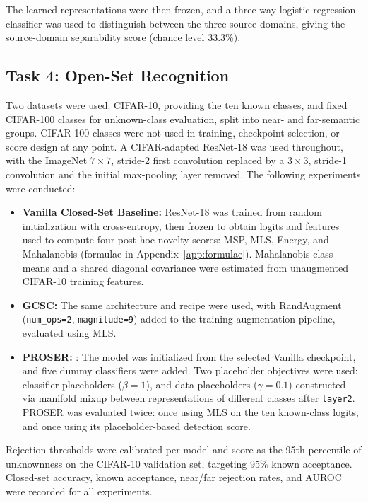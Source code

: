 \documentclass{article}
\begin{document}
The learned representations were then frozen, and a three-way logistic-regression classifier was used to distinguish between the three source domains, giving the source-domain separability score (chance level 33.3\%).
 
\subsection{Task 4: Open-Set Recognition}
\label{subsec:methods-task4}
 
Two datasets were used: CIFAR-10, providing the ten known classes, and fixed CIFAR-100 classes for unknown-class evaluation, split into near- and far-semantic groups. CIFAR-100 classes were not used in training, checkpoint selection, or score design at any point. A CIFAR-adapted ResNet-18 was used throughout, with the ImageNet $7 \times 7$, stride-2 first convolution replaced by a $3 \times 3$, stride-1 convolution and the initial max-pooling layer removed. The following experiments were conducted:
 
\begin{itemize}
    \item \textbf{Vanilla Closed-Set Baseline:} ResNet-18 was trained from random initialization with cross-entropy, then frozen to obtain logits and features used to compute four post-hoc novelty scores: MSP, MLS, Energy, and Mahalanobis (formulae in Appendix~\ref{app:formulae}). Mahalanobis class means and a shared diagonal covariance were estimated from unaugmented CIFAR-10 training features.
    \item \textbf{GCSC:} The same architecture and recipe were used, with RandAugment (\texttt{num\_ops=2}, \texttt{magnitude=9}) added to the training augmentation pipeline, evaluated using MLS.
    \item \textbf{PROSER:} \citep{zhou2021proser}: The model was initialized from the selected Vanilla checkpoint, and five dummy classifiers were added. Two placeholder objectives were used: classifier placeholders ($\beta = 1$), and data placeholders ($\gamma = 0.1$) constructed via manifold mixup \citep{verma2019manifold} between representations of different classes after \texttt{layer2}. PROSER was evaluated twice: once using MLS on the ten known-class logits, and once using its placeholder-based detection score.
\end{itemize}
 
Rejection thresholds were calibrated per model and score as the 95th percentile of unknownness on the CIFAR-10 validation set, targeting 95\% known acceptance. Closed-set accuracy, known acceptance, near/far rejection rates, and AUROC were recorded for all experiments.
\end{document}
